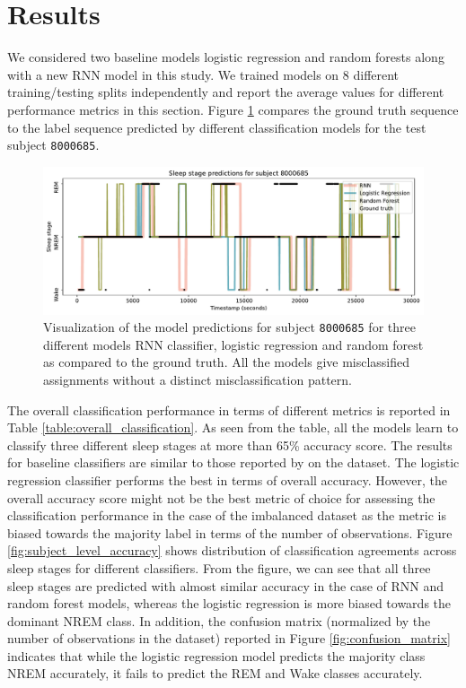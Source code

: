 \documentclass[12pt]{article}
\begin{document}
\section{Results}
We considered two baseline models logistic regression and random forests along with a new RNN model in this study. We trained models on 8 different training/testing splits independently and report the average values for different performance metrics in this section. Figure \ref{fig:8000685_prediction} compares the ground truth sequence to the label sequence predicted by different classification models for the test subject \texttt{8000685}.


\begin{figure}
\centering
\includegraphics[width=\textwidth]{figures/8000685_predictions.pdf}
\caption{Visualization of the model predictions for subject  \texttt{8000685} for three different models RNN classifier, logistic regression and random forest as compared to the ground truth. All the models give misclassified assignments without a distinct misclassification pattern.}
\label{fig:8000685_prediction}
\end{figure}

The overall classification performance in terms of different metrics is reported in Table \ref{table:overall_classification}. As seen from the table, all the models learn to classify three different sleep stages at more than 65\% accuracy score. The results for baseline classifiers are similar to those reported by \cite{walch2019} on the dataset. The logistic regression classifier performs the best in terms of overall accuracy. However, the overall accuracy score might not be the best metric of choice for assessing the classification performance in the case of the imbalanced dataset as the metric is biased towards the majority label in terms of the number of observations. Figure \ref{fig:subject_level_accuracy} shows distribution of  classification agreements across sleep stages for different classifiers. From the figure, we can see that all three sleep stages are predicted with almost similar accuracy in the case of RNN and random forest models, whereas the logistic regression is more biased towards the dominant NREM class. In addition, the confusion matrix (normalized by the number of observations in the dataset) reported in Figure \ref{fig:confusion_matrix} indicates that while the logistic regression model predicts the majority class NREM accurately, it fails to predict the REM and Wake classes accurately.  
\end{document}
